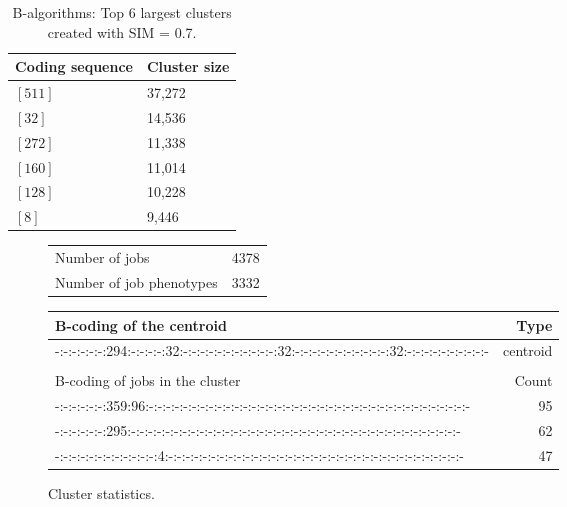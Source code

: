 \documentclass{jhps}
\begin{document}
\begin{table}
	\centering
	\begin{tabular}{ll}
		Coding sequence & Cluster size \\
		\midrule
		$[511]$ & 37,272 \\
		$[32]$  & 14,536 \\
		$[272]$ & 11,338 \\
		$[160]$ & 11,014 \\
		$[128]$ & 10,228 \\
		$[8]$   & 9,446  \\
	\end{tabular}
	\caption{B-algorithms: Top 6 largest clusters created with SIM = 0.7.}
	\label{tab:bin:largest_clusters}
\end{table}

\begin{figure}
	\begin{subtable}{\textwidth}
		\centering
		\begin{tabular}{lr}
		 Number of jobs & 4378 \\
		 Number of job phenotypes & 3332 \\
		\end{tabular}
		\caption{Cluster statistics.}
		\label{cluster:bin_all:stats}
	\end{subtable}
	\medskip
	\begin{subtable}{\textwidth}
		\centering
		\begin{tiny}
      \begin{tabular}{l|r}
       \rowcolor{tblhead}
       B-coding of the centroid                                                                    &  Type     \\
       \hline
       -:-:-:-:-:-:294:-:-:-:-:32:-:-:-:-:-:-:-:-:-:-:-:32:-:-:-:-:-:-:-:-:-:-:-:32:-:-:-:-:-:-:-:-:-:- &  centroid \\
       \multicolumn{2}{l}{}                                                                             \\
       \rowcolor{tblhead}
       B-coding of jobs in the cluster                                                             &  Count    \\
       \hline
       -:-:-:-:-:-:359:96:-:-:-:-:-:-:-:-:-:-:-:-:-:-:-:-:-:-:-:-:-:-:-:-:-:-:-:-:-:-:-:-:-:-:-:-:-:-   &  95       \\
       -:-:-:-:-:-:295:-:-:-:-:-:-:-:-:-:-:-:-:-:-:-:-:-:-:-:-:-:-:-:-:-:-:-:-:-:-:-:-:-:-:-:-:-:-:-    &  62       \\
       -:-:-:-:-:-:-:-:-:-:-:-:4:-:-:-:-:-:-:-:-:-:-:-:-:-:-:-:-:-:-:-:-:-:-:-:-:-:-:-:-:-:-:-:-:-:-:-  &  47       \\

\end{tabular}
\end{tiny}
\end{subtable}
\end{figure}
\end{document}
